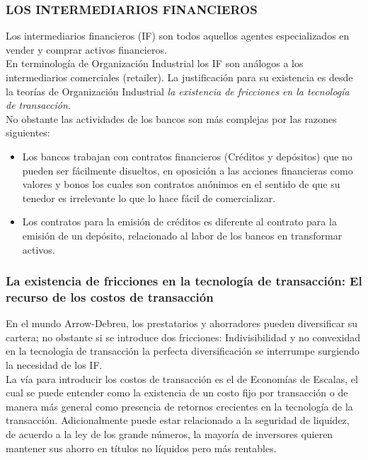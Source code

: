 \begin{frame}
	\frametitle{{\normalsize LOS INTERMEDIARIOS FINANCIEROS} {}}
	\setcounter{equation}{0}
    Los intermediarios financieros (IF) son todos aquellos agentes especializados en vender y comprar activos financieros.\\
    En terminología de Organización Industrial los IF son análogos a los intermediarios comerciales (retailer). La justificación para su existencia es desde la teorías de Organización Industrial  \textit{la existencia de fricciones en la tecnología de transacción.}\\
    No obstante las actividades de los bancos son más complejas por las razones siguientes:
    \begin{itemize}
        \item Los bancos trabajan con contratos financieros (Créditos y depósitos) que no pueden ser fácilmente disueltos, en oposición a las acciones financieras como valores y bonos los cuales son contratos anónimos en el sentido de que su tenedor es irrelevante lo que lo hace fácil de comercializar.
        \item Los contratos para la emisión de créditos es diferente al contrato para la emisión de un depósito, relacionado al labor de los bancos en transformar activos. 
    \end{itemize} 
    
    
    	
\end{frame}

\begin{frame}
    \frametitle{{\normalsize La existencia de fricciones en la tecnología de transacción: El recurso de los costos de transacción} {}}
    
    En el mundo Arrow-Debreu, los prestatarios y ahorradores pueden diversificar su cartera; no obstante si se introduce dos fricciones: Indivisibilidad y no convexidad en la tecnología de transacción la perfecta diversificación se interrumpe surgiendo la necesidad de los IF.\\
    La vía para introducir los costos de transacción es el de Economías de Escalas, el cual se puede entender como la existencia de un costo fijo por transacción o de manera más general como presencia de retornos crecientes en la tecnología de la transacción. Adicionalmente puede estar relacionado a la seguridad de liquidez, de acuerdo a la ley de los grande números, la mayoría de inversores quieren mantener sus ahorro en títulos no líquidos pero más rentables.\\
    
    
    
    
    
    
    
    
\end{frame}

